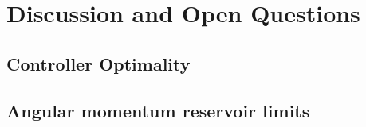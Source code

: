 \documentclass{llncs}
\begin{document}








\section{Discussion and Open Questions}


\subsection{Controller Optimality}


\subsection{Angular momentum reservoir limits}
\end{document}
